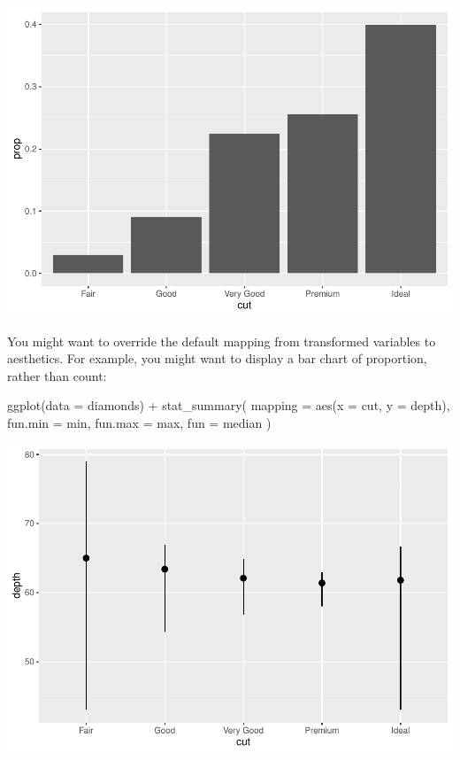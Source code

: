 \documentclass[
]{article}
\newenvironment{Shaded}{\begin{snugshade}}{\end{snugshade}}
\newcommand{\AttributeTok}[1]{\textcolor[rgb]{0.77,0.63,0.00}{#1}}
\newcommand{\FunctionTok}[1]{\textcolor[rgb]{0.00,0.00,0.00}{#1}}
\newcommand{\NormalTok}[1]{#1}
\newcommand{\SpecialCharTok}[1]{\textcolor[rgb]{0.00,0.00,0.00}{#1}}
\begin{document}
\includegraphics{Journal_files/figure-latex/unnamed-chunk-52-1.pdf}

You might want to override the default mapping from transformed
variables to aesthetics. For example, you might want to display a bar
chart of proportion, rather than count:

\begin{Shaded}
\begin{Highlighting}[]
\FunctionTok{ggplot}\NormalTok{(}\AttributeTok{data =}\NormalTok{ diamonds) }\SpecialCharTok{+} 
  \FunctionTok{stat\_summary}\NormalTok{(}
    \AttributeTok{mapping =} \FunctionTok{aes}\NormalTok{(}\AttributeTok{x =}\NormalTok{ cut, }\AttributeTok{y =}\NormalTok{ depth),}
    \AttributeTok{fun.min =}\NormalTok{ min,}
    \AttributeTok{fun.max =}\NormalTok{ max,}
    \AttributeTok{fun =}\NormalTok{ median}
\NormalTok{  )}
\end{Highlighting}
\end{Shaded}

\includegraphics{Journal_files/figure-latex/unnamed-chunk-53-1.pdf}
\end{document}
